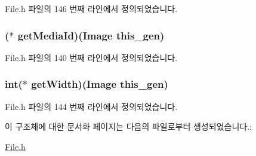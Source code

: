 File.\-h 파일의 146 번째 라인에서 정의되었습니다.

\hypertarget{struct___image_a3ebc4a1fcad891955f6bd315dbf79b87}{
\subsubsection[{get\-Media\-Id}]{($\ast$  get\-Media\-Id)({\bf Image} this\-\_\-gen)}}\label{struct___image_a3ebc4a1fcad891955f6bd315dbf79b87}


File.\-h 파일의 140 번째 라인에서 정의되었습니다.

\hypertarget{struct___image_ac1af259a21d8c67dab2729dc2ca8e6ab}{
\subsubsection[{get\-Width}]{\setlength{\rightskip}{0pt plus 5cm}int($\ast$  get\-Width)({\bf Image} this\-\_\-gen)}}\label{struct___image_ac1af259a21d8c67dab2729dc2ca8e6ab}


File.\-h 파일의 144 번째 라인에서 정의되었습니다.



이 구조체에 대한 문서화 페이지는 다음의 파일로부터 생성되었습니다.\-:\begin{DoxyCompactItemize}
\item 
\hyperlink{_file_8h}{File.\-h}\end{DoxyCompactItemize}
